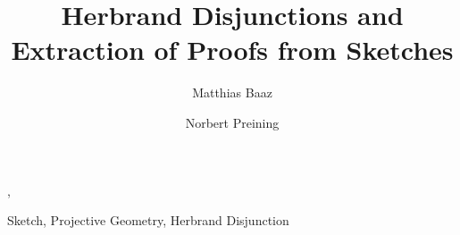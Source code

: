 \documentclass{elsart}
\begin{document}
\begin{frontmatter}
%
%
\title{Herbrand Disjunctions and Extraction of Proofs from Sketches}

\author{Matthias Baaz},
\author{Norbert Preining}
\address{Institute for Algebra and Computational Mathematics\\%
  University of Technology\\%
  Vienna, Austria}



\begin{keyword}
Sketch, Projective Geometry, Herbrand Disjunction
\end{keyword}
\end{frontmatter}









\end{document}

